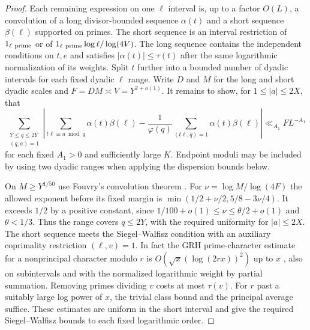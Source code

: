 \documentclass[11pt,a4paper]{article}
\numberwithin{equation}{section}
\begin{document}
\begin{proof}
Each remaining expression on one $\ell$ interval is,
up to a factor $O(L)$, a convolution of a
long divisor-bounded sequence $\alpha(t)$ and a
short sequence $\beta(\ell)$ supported on primes.
The short sequence is an interval restriction of
$1_{\ell\ {\rm prime}}$ or of
$1_{\ell\ {\rm prime}}\log\ell/\log(4V)$.
The long sequence contains the independent
conditions on $t,e$ and satisfies $|\alpha(t)|\le\tau(t)$
after the same logarithmic normalization of its weights.
Split $t$ further into a bounded number of dyadic
intervals for each fixed dyadic $\ell$ range. Write
$D$ and $M$ for the long and short dyadic scales and
$F=DM\asymp V=Y^{2+o(1)}$. It remains to show, for
$1\le |a|\le2X$, that
\begin{equation}
 \sum_{\substack{Y\le q\le2Y\\(q,a)=1}}
 \left|\sum_{t\ell\equiv a\bmod q}\alpha(t)\beta(\ell)
  -\frac{1}{\varphi(q)}
     \sum_{(t\ell,q)=1}\alpha(t)\beta(\ell)\right|
 \ll_{A_1} F L^{-A_1}
 \label{eq:criticalgridrough-tail-dispersion}
\end{equation}
for each fixed $A_1>0$ and sufficiently large $K$.
Endpoint moduli may be included by using two dyadic
ranges when applying the dispersion bounds below.

On $M\ge Y^{1/50}$ use Fouvry's convolution theorem
\cite[Th\'eor\`eme~1]{Fouvry1984}. For
$\nu=\log M/\log(4F)$ the allowed exponent before its
fixed margin is $\min(1/2+\nu/2,5/8-3\nu/4)$.
It exceeds $1/2$ by a positive constant, since
$1/100+o(1)\le\nu\le\theta/2+o(1)$ and $\theta<1/3$.
Thus the range covers $q\le2Y$, with the required
uniformity for $|a|\le2X$. The short sequence meets
the Siegel--Walfisz condition with an auxiliary
coprimality restriction $(\ell,v)=1$. In fact the
GRH prime-character estimate for a nonprincipal
character modulo $r$ is
$O(\sqrt x(\log(2rx))^2)$ up to $x$
\cite[Section~4]{LeeGRH}, also on
subintervals and with the normalized logarithmic
weight by partial summation. Removing primes dividing
$v$ costs at most $\tau(v)$. For $r$ past a suitably
large log power of $x$, the trivial class bound and
the principal average suffice. These estimates are
uniform in the short interval and give the required
Siegel--Walfisz bounds to each fixed logarithmic order.


\end{proof}
\end{document}
